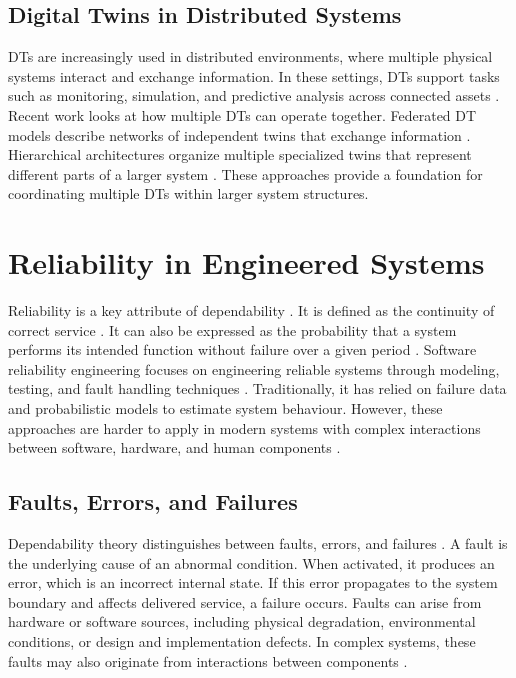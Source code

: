 \subsection{Digital Twins in Distributed Systems}
DTs are increasingly used in distributed environments, where multiple physical systems interact and exchange information. In these settings, DTs support tasks such as monitoring, simulation, and predictive analysis across connected assets \cite{negri2017review, tao2018digital}.  Recent work looks at how multiple DTs can operate together. Federated DT models describe networks of independent twins that exchange information  \cite{vergara2023federated}. Hierarchical architectures organize multiple specialized twins that represent different parts of a larger system \cite{kunnari2025distributed}.  These approaches provide a foundation for coordinating multiple DTs within larger system structures.

\section{Reliability in Engineered Systems}\label{sec:background-reliability}
Reliability is a key attribute of dependability \cite{avizienis2004basic}. It is defined as the continuity of correct service \cite{avizienis2004basic}. It can also be expressed as the probability that a system performs its intended function without failure over a given period \cite{elsayed2021reliability}.  Software reliability engineering focuses on engineering reliable systems through modeling, testing, and fault handling techniques \cite{lyu2007software}. Traditionally, it has relied on failure data and probabilistic models to estimate system behaviour. However, these approaches are harder to apply in modern systems with complex interactions between software, hardware, and human components \cite{zio2009reliability}.

\subsection{Faults, Errors, and Failures}\label{sec:background-reliability-faults}
Dependability theory distinguishes between faults, errors, and failures \cite{avizienis2004basic}. A fault is the underlying cause of an abnormal condition. When activated, it produces an error, which is an incorrect internal state. If this error propagates to the system boundary and affects delivered service, a failure occurs. Faults can arise from hardware or software sources, including physical degradation, environmental conditions, or design and implementation defects. In complex systems, these faults may also originate from interactions between components \cite{ahmed2013survey}.

